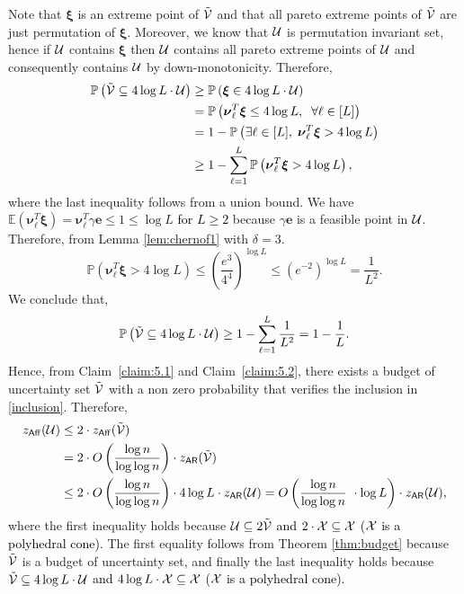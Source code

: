 \documentclass[moor]{informs1}              %
\newcommand{\mb}[1]{\ensuremath{\boldsymbol{#1}}}
\newcommand*{\red}{\textcolor{black}}
\begin{document}
\noindent
Note that $\mb {\xi}$ is an extreme point of $\tilde{\cal V}$ and that all pareto extreme points of $\tilde{\cal V}$  are just permutation of $\mb  {\xi}$. Moreover, we know that $\cal U$ is permutation invariant set, hence  if $\cal U$ contains $ \mb {\xi}$ then $\cal U$ contains all pareto extreme points of $\cal U$ and consequently contains $\cal U$ by down-monotonicity. Therefore,
\begin{align*}
\mathbb{P} \left(  \tilde{\cal V} \subseteq  4 \log L \cdot {\cal U} \right)  & \geq  \mathbb{P} \left(  \mb {\xi} \in  4 \log L \cdot {\cal U} \right)  \\
& =  \mathbb{P} \left(  \mb {\nu}_{\ell}^T \mb {\xi} \leq   4 \log L, \; \; \forall \ell \in  [L] \right)  \\
& =  1-  \mathbb{P} \left(  \exists \ell \in [L],      \;   \mb {\nu}_{\ell}^T \mb {\xi} >   4 \log L   \right)  \\
& \geq  1-  \sum_{\ell=1}^L \mathbb{P} \left(   \mb {\nu}_{\ell}^T \mb {\xi} >   4 \log L   \right),
\end{align*}
where the last inequality follows from a union bound. We have $ \mathbb{E}( \mb {\nu}_{\ell}^T \mb {\xi} ) = \mb {\nu}_{\ell}^T \gamma \mb e \leq 1 \leq \log L$ \red{for $L \geq 2$} because $\gamma \mb e $ is a feasible point in $\cal U$.  Therefore, from Lemma \ref{lem:chernof1} with $\delta=3$.
$$ \mathbb{P} \left(   \mb {\nu}_{\ell}^T \mb {\xi} >   4 \log L   \right) \leq \left( \frac{e^3}{4^4}\right)^{\log L} \leq \left(e^{-2} \right)^{\log L}  = \frac{1}{L^2}.$$
We conclude that,
\begin{align*}
\mathbb{P} \left(  \tilde{\cal V} \subseteq  4 \log L \cdot {\cal U} \right)  \geq  1-  \sum_{\ell=1}^L  \frac{1}{L^2} = 1- \frac{1}{L} . \\
\end{align*}
Hence, from Claim~\ref{claim:5.1} and Claim~\ref{claim:5.2}, there exists a budget of uncertainty set $\tilde{\cal V}$ with a non zero probability  that verifies the inclusion in \eqref{inclusion}.
Therefore,
\begin{align*}
z_{\sf Aff}({\cal U}) & \leq 2 \cdot   z_{\sf Aff}( \tilde{\cal V}) \\
&= 2 \cdot O \left( \frac{\log n}{\log \log n} \right) \cdot   z_{\sf AR}( \tilde{\cal V}) \\
&\leq 2 \cdot O \left( \frac{\log n}{\log \log n} \right)  \cdot 4 \log L \cdot   z_{\sf AR}( {\cal U})= O\left( \frac{\log n}{\log \log n}\ \cdot \log L \right) \cdot z_{\sf AR}({\cal U}),
\end{align*}
where the first inequality holds because $ {\cal U} \subseteq  2 \tilde{\cal V}$ \red{and $ 2 \cdot\cal X \subseteq  {\cal X}$ ($\cal X$ is a polyhedral cone).} The first equality follows from Theorem \ref{thm:budget} because $\tilde{\cal V}$ is a budget of uncertainty set, and finally the last inequality holds because $  \tilde{\cal V} \subseteq  4 \log L \cdot     \cal U$ \red{and  $ 4 \log L \cdot\cal X \subseteq  {\cal X}$ ($\cal X$ is a polyhedral cone).}
\hfill
\Halmos
\endproof
\end{document}
